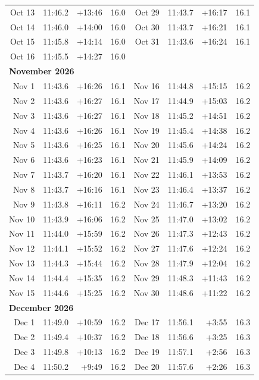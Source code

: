 {\begin{longtable}{r r r r | r r r r}
Oct 13 & 11:46.2 & +13:46 & 16.0 & Oct 29 & 11:43.7 & +16:17 & 16.1 \\
Oct 14 & 11:46.0 & +14:00 & 16.0 & Oct 30 & 11:43.7 & +16:21 & 16.1 \\
Oct 15 & 11:45.8 & +14:14 & 16.0 & Oct 31 & 11:43.6 & +16:24 & 16.1 \\
Oct 16 & 11:45.5 & +14:27 & 16.0 &  & & &  \\
\multicolumn{8}{l}{\textbf{November 2026}}\\
Nov 1 & 11:43.6 & +16:26 & 16.1 & Nov 16 & 11:44.8 & +15:15 & 16.2 \\
Nov 2 & 11:43.6 & +16:27 & 16.1 & Nov 17 & 11:44.9 & +15:03 & 16.2 \\
Nov 3 & 11:43.6 & +16:27 & 16.1 & Nov 18 & 11:45.2 & +14:51 & 16.2 \\
Nov 4 & 11:43.6 & +16:26 & 16.1 & Nov 19 & 11:45.4 & +14:38 & 16.2 \\
Nov 5 & 11:43.6 & +16:25 & 16.1 & Nov 20 & 11:45.6 & +14:24 & 16.2 \\
Nov 6 & 11:43.6 & +16:23 & 16.1 & Nov 21 & 11:45.9 & +14:09 & 16.2 \\
Nov 7 & 11:43.7 & +16:20 & 16.1 & Nov 22 & 11:46.1 & +13:53 & 16.2 \\
Nov 8 & 11:43.7 & +16:16 & 16.1 & Nov 23 & 11:46.4 & +13:37 & 16.2 \\
Nov 9 & 11:43.8 & +16:11 & 16.2 & Nov 24 & 11:46.7 & +13:20 & 16.2 \\
Nov 10 & 11:43.9 & +16:06 & 16.2 & Nov 25 & 11:47.0 & +13:02 & 16.2 \\
Nov 11 & 11:44.0 & +15:59 & 16.2 & Nov 26 & 11:47.3 & +12:43 & 16.2 \\
Nov 12 & 11:44.1 & +15:52 & 16.2 & Nov 27 & 11:47.6 & +12:24 & 16.2 \\
Nov 13 & 11:44.3 & +15:44 & 16.2 & Nov 28 & 11:47.9 & +12:04 & 16.2 \\
Nov 14 & 11:44.4 & +15:35 & 16.2 & Nov 29 & 11:48.3 & +11:43 & 16.2 \\
Nov 15 & 11:44.6 & +15:25 & 16.2 & Nov 30 & 11:48.6 & +11:22 & 16.2 \\
\multicolumn{8}{l}{\textbf{December 2026}}\\
Dec 1 & 11:49.0 & +10:59 & 16.2 & Dec 17 & 11:56.1 & +3:55 & 16.3 \\
Dec 2 & 11:49.4 & +10:37 & 16.2 & Dec 18 & 11:56.6 & +3:25 & 16.3 \\
Dec 3 & 11:49.8 & +10:13 & 16.2 & Dec 19 & 11:57.1 & +2:56 & 16.3 \\
Dec 4 & 11:50.2 & +9:49 & 16.2 & Dec 20 & 11:57.6 & +2:26 & 16.3 \\

\end{longtable}}
